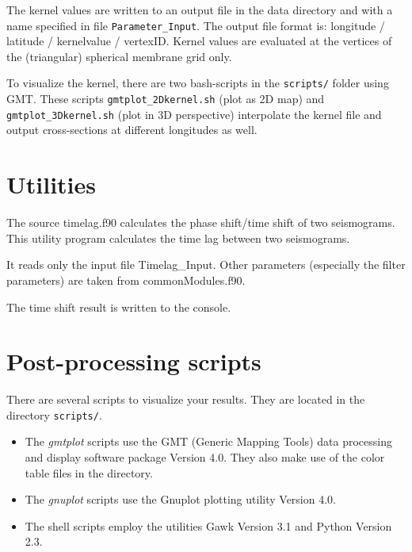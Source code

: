 \documentclass[a4paper,
                          headsepline,
                          listof=totoc,
                          toc=listof,
                          headings=small]{scrreprt} %
\begin{document}
The kernel values are written to an output file in the data directory and with a name
specified in file \texttt{Parameter\_Input}. The output file format is: longitude / latitude / kernelvalue / vertexID.
Kernel values are evaluated at the vertices of the (triangular)
spherical membrane grid only.


To visualize the kernel, there are two bash-scripts in the \texttt{scripts/} folder
using GMT. These scripts \texttt{gmtplot\_2Dkernel.sh} (plot as 2D map) and
\texttt{gmtplot\_3Dkernel.sh} (plot in 3D perspective) interpolate the kernel file
and output cross-sections at different longitudes as well.




\appendix
\chapter{Utilities}

The source timelag.f90 calculates the phase shift/time shift of two seismograms.
This utility program calculates the time lag between two seismograms.

It reads only the input file Timelag\_Input. Other parameters (especially
the filter parameters) are taken from commonModules.f90.

The time shift result is written to the console.


\chapter{Post-processing scripts}
There are several scripts to visualize your results. They are located in the
directory \texttt{scripts/}.


\begin{itemize}
  \item
The \textit{gmtplot} scripts use the GMT
(Generic Mapping Tools) data processing and display software package Version 4.0.
They also make use of the color table files in the directory.

  \item
The \textit{gnuplot} scripts use the Gnuplot plotting utility Version 4.0.

  \item
The shell scripts employ the utilities Gawk Version 3.1 and Python Version 2.3.

\end{itemize}
\end{document}
